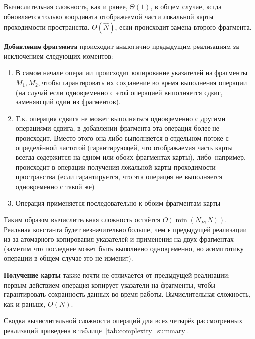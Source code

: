 Вычислительная сложность, как и ранее, $\Theta(1)$, в общем случае, когда обновляется только координата отображаемой части локальной карты проходимости пространства. $\Theta(\widehat{N})$, если происходит замена второго фрагмента.

\textbf{Добавление фрагмента} происходит аналогично предыдущим реализациям за исключением следующих моментов:

\begin{enumerate}
	\item В самом начале операции происходит копирование указателей на фрагменты $M_1, M_2$, чтобы гарантировать их сохранение во время выполнения операции (на случай если одновременно с этой операцией выполняется сдвиг, заменяющий один из фрагментов). 
	\item Т.к. операция сдвига не может выполняться одновременно с другими операциями сдвига, в добавлении фрагмента эта операция более не происходит. Вместо этого она либо выполняется в отдельном потоке с определённой частотой (гарантирующей, что отображаемая часть карты всегда содержится на одном или обоих фрагментах карты), либо, например, происходит в операции получения локальной карты проходимости пространства (если гарантируется, что эта операция не выполняется одновременно с такой же)
	\item Операция применяется последовательно к обоим фрагментам карты
\end{enumerate}

Таким образом вычислительная сложность остаётся $O(\min(N_P, N))$. Реальная константа будет незначительно больше, чем в предыдущей реализации из-за атомарного копирования указателей и применения на двух фрагментах (заметим что последнее может быть выполнено одновременно, но асимптотику операции в общем случае это не изменит).

\textbf{Получение карты} также почти не отличается от предыдущей реализации: первым действием операция копирует указатели на фрагменты, чтобы гарантировать сохранность данных во время работы. Вычислительная сложность, как и раньше, $O(N)$.

Сводка вычислительной сложности операций для всех четырёх рассмотренных реализаций приведена в таблице~\ref{tab:complexity_summary}.

